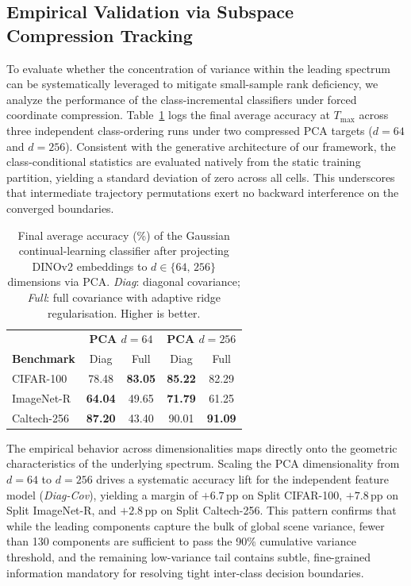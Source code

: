 \subsection{Empirical Validation via Subspace Compression Tracking}
\label{sec:pca_cl_results}

To evaluate whether the concentration of variance within the leading spectrum can be systematically leveraged to mitigate small-sample rank deficiency, we analyze the performance of the class-incremental classifiers under forced coordinate compression. Table~\ref{tab:pca_accuracy} logs the final average accuracy at $T_{\max}$ across three independent class-ordering runs under two compressed PCA targets ($d=64$ and $d=256$). Consistent with the generative architecture of our framework, the class-conditional statistics are evaluated natively from the static training partition, yielding a standard deviation of zero across all cells. This underscores that intermediate trajectory permutations exert no backward interference on the converged boundaries.

\begin{table}[htbp]
	\centering
	\caption{Final average accuracy (\%) of the Gaussian continual-learning classifier after projecting DINOv2 embeddings to $d\!\in\!\{64,\,256\}$ dimensions via PCA. \emph{Diag}: diagonal covariance; \emph{Full}: full covariance with adaptive ridge regularisation. Higher is better.}
	\label{tab:pca_accuracy}
	\small
	\setlength{\tabcolsep}{5pt}
	\begin{tabular}{l|cc|cc}
		\toprule
		& \multicolumn{2}{c|}{\textbf{PCA $d=64$}} & \multicolumn{2}{c}{\textbf{PCA $d=256$}} \\
		\textbf{Benchmark} & Diag & Full & Diag & Full \\
		\midrule
		CIFAR-100      & 78.48 & \textbf{83.05} & \textbf{85.22} & 82.29 \\
		ImageNet-R     & \textbf{64.04} & 49.65 & \textbf{71.79} & 61.25 \\
		Caltech-256    & \textbf{87.20} & 43.40 & 90.01 & \textbf{91.09} \\
		\bottomrule
	\end{tabular}
\end{table}

The empirical behavior across dimensionalities maps directly onto the geometric characteristics of the underlying spectrum. Scaling the PCA dimensionality from $d=64$ to $d=256$ drives a systematic accuracy lift for the independent feature model (\emph{Diag-Cov}), yielding a margin of $+6.7$\,pp on Split CIFAR-100, $+7.8$\,pp on Split ImageNet-R, and $+2.8$\,pp on Split Caltech-256. This pattern confirms that while the leading components capture the bulk of global scene variance, fewer than 130 components are sufficient to pass the 90\% cumulative variance threshold, and the remaining low-variance tail contains subtle, fine-grained information mandatory for resolving tight inter-class decision boundaries. 

